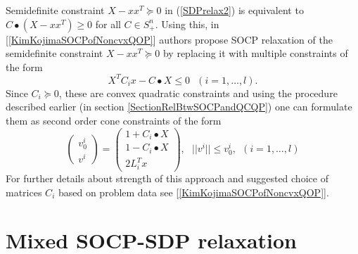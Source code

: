 \documentclass[10pt,oneside]{book}
\theoremstyle{definition}
\begin{document}
Semidefinite constraint $X-xx^T\succeq 0$  in (\ref{SDPrelax2}) is equivalent to $C\bullet(X-xx^T)\geq 0$ for all $C\in S^n_+$. Using this, in [\ref{KimKojimaSOCPofNoncvxQOP}] authors propose SOCP relaxation of the semidefinite constraint $X-xx^T\succeq 0$ by replacing it with multiple constraints of the form 
$$X^TC_ix-C\bullet X \leq 0 \ \ \ (i=1,\dots ,l).$$ 
Since $C_i\succeq 0$, these are convex quadratic constraints and using the procedure described earlier (in section \ref{SectionRelBtwSOCPandQCQP}) one can formulate them as second order cone constraints of the form
\begin{equation}
\label{SOCPRelaxOfPSDconstraint}
\left(\begin{array}{c}
v^i_0\\
v^i
\end{array}\right)
= \left(\begin{array}{c}
1+C_i\bullet X\\
1-C_i\bullet X \\
2L_i^Tx
\end{array}\right), \ \ \ ||v^i||\leq v^i_0, \ \ (i  = 1,\dots ,l)
\end{equation}
For further details about strength of this approach and suggested choice of matrices $C_i$ based on problem data see [\ref{KimKojimaSOCPofNoncvxQOP}].


\section{Mixed SOCP-SDP relaxation}
\end{document}
